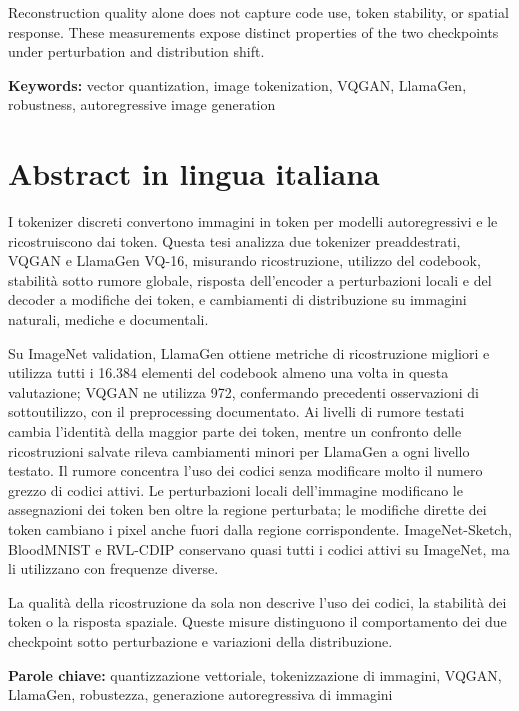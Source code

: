 \documentclass{Configuration_Files/PoliMi3i_thesis}
\begin{document}
Reconstruction quality alone does not capture code use, token stability, or
spatial response. These measurements expose distinct properties of the two
checkpoints under perturbation and distribution shift.
\par\smallskip
\textbf{Keywords:} vector quantization, image tokenization, VQGAN, LlamaGen, robustness, autoregressive image generation %

\chapter*{Abstract in lingua italiana}
I tokenizer discreti convertono immagini in token per modelli autoregressivi
e le ricostruiscono dai token. Questa tesi analizza due tokenizer preaddestrati,
VQGAN e LlamaGen VQ-16, misurando ricostruzione, utilizzo del codebook,
stabilit\`a sotto rumore globale, risposta dell'encoder a perturbazioni locali
e del decoder a modifiche dei token, e cambiamenti di distribuzione su
immagini naturali, mediche e documentali.

Su ImageNet validation, LlamaGen ottiene metriche di ricostruzione migliori e
utilizza tutti i 16.384 elementi del codebook almeno una volta in questa
valutazione; VQGAN ne utilizza 972, confermando precedenti osservazioni di
sottoutilizzo, con il preprocessing documentato. Ai livelli di rumore testati
cambia l'identit\`a della maggior parte dei token, mentre un confronto delle
ricostruzioni salvate rileva cambiamenti minori per LlamaGen a ogni livello
testato. Il rumore concentra l'uso dei codici senza modificare molto il numero
grezzo di codici attivi. Le perturbazioni locali dell'immagine modificano le
assegnazioni dei token ben oltre la regione perturbata; le modifiche dirette
dei token cambiano i pixel anche fuori dalla regione corrispondente.
ImageNet-Sketch, BloodMNIST e RVL-CDIP conservano quasi tutti i codici attivi
su ImageNet, ma li utilizzano con frequenze diverse.

La qualit\`a della ricostruzione da sola non descrive l'uso dei codici, la
stabilit\`a dei token o la risposta spaziale. Queste misure distinguono il
comportamento dei due checkpoint sotto perturbazione e variazioni della
distribuzione.
\par\smallskip
\textbf{Parole chiave:} quantizzazione vettoriale, tokenizzazione di immagini, VQGAN, LlamaGen, robustezza, generazione autoregressiva di immagini %

\end{document}

